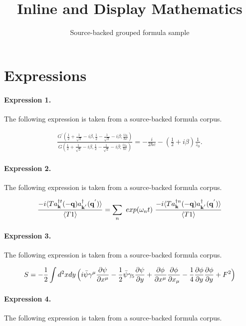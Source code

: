\documentclass[11pt]{article}
\title{Inline and Display Mathematics}
\author{Source-backed grouped formula sample}
\date{}
\begin{document}
\maketitle
\section{Expressions}
\paragraph{Expression 1.} The following expression is taken from a source-backed formula corpus.

\begin{align*}\frac{G^{\prime}(\frac{1}{2} + \frac{1}{\sqrt{2}} -i{\beta},\frac{1}{2} - \frac{1}{\sqrt{2}} -i{\beta}; \frac{iz_0}{{\hbar}c})}{G(\frac{1}{2} + \frac{1}{\sqrt{2}} -i{\beta},\frac{1}{2} - \frac{1}{\sqrt{2}} -i{\beta}; \frac{iz_0}{{\hbar}c} )}= - \frac{i}{2{\hbar}c} - (\frac{1}{2} +i{\beta})\frac{1}{z_0}.\end{align*}

\paragraph{Expression 2.} The following expression is taken from a source-backed formula corpus.

\begin{align*}\frac{ -i\langle T a^{\dagger t}_{ {\bf{k}} }(-{\bf{q}})a^{\dagger}_{ {\bf{k}}^{'} }({\bf{q}}^{'}) \rangle }{\langle T 1 \rangle} = \sum_{n}\text{ }exp(\omega_{n}t)\text{ }\frac{ -i\langle T a^{\dagger n}_{ {\bf{k}} }(-{\bf{q}})a^{\dagger}_{ {\bf{k}}^{'} }({\bf{q}}^{'}) \rangle }{\langle T 1 \rangle}\end{align*}

\paragraph{Expression 3.} The following expression is taken from a source-backed formula corpus.

\begin{align*}S=-\frac{1}{2}\int d^2xdy\,\Bigl(i\bar\psi\gamma^\mu\frac{\partial\psi}{\partial x^\mu}-\frac{1}{2}\bar\psi\gamma_5\frac{\partial\psi}{\partial y}+\frac{\partial\phi}{\partial x^\mu}\frac{\partial\phi}{\partial x_\mu}-\frac{1}{4}\frac{\partial\phi}{\partial y}\frac{\partial\phi}{\partial y}+F^2\Bigr)\end{align*}

\paragraph{Expression 4.} The following expression is taken from a source-backed formula corpus.
\end{document}
